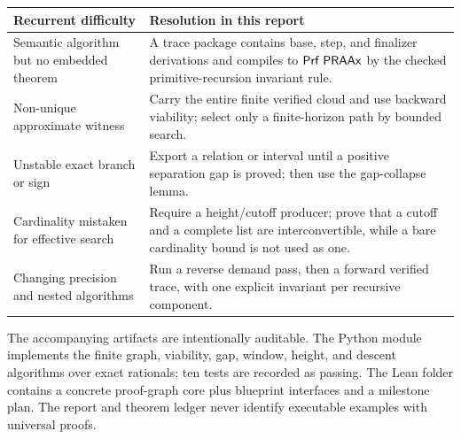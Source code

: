 \begin{center}
\begin{tabularx}{0.96\textwidth}{@{}p{}X@{}}
\toprule
Recurrent difficulty & Resolution in this report \\
\midrule
Semantic algorithm but no embedded theorem & A trace package contains base,
step, and finalizer derivations and compiles to \(\mathsf{Prf}\;\mathsf{PRAAx}\) by the checked
primitive-recursion invariant rule. \\
Non-unique approximate witness & Carry the entire finite verified cloud and
use backward viability; select only a finite-horizon path by bounded search. \\
Unstable exact branch or sign & Export a relation or interval until a positive
separation gap is proved; then use the gap-collapse lemma. \\
Cardinality mistaken for effective search & Require a height/cutoff producer;
prove that a cutoff and a complete list are interconvertible, while a bare
cardinality bound is not used as one. \\
Changing precision and nested algorithms & Run a reverse demand pass, then a
forward verified trace, with one explicit invariant per recursive component. \\
\bottomrule
\end{tabularx}
\end{center}

The accompanying artifacts are intentionally auditable.  The Python module
implements the finite graph, viability, gap, window, height, and descent
algorithms over exact rationals; ten tests are recorded as passing.  The Lean
folder contains a concrete proof-graph core plus blueprint interfaces and a
milestone plan.  The report and theorem ledger never identify executable
examples with universal proofs.
